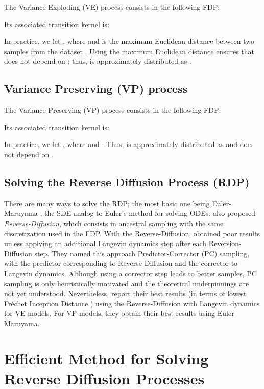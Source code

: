 \documentclass{article}
\begin{document}
The Variance Exploding (VE) process consists in the following FDP:


Its associated transition kernel is:


In practice, we let , where  and  is the maximum Euclidean distance between two samples from the dataset  \citep{song2020improved}. Using the maximum Euclidean distance ensures that  does not depend on ; thus,  is approximately distributed as .

\subsection{Variance Preserving (VP) process}

The Variance Preserving (VP) process consists in the following FDP:


Its associated transition kernel is:


In practice, we let , where  and .
Thus,  is approximately distributed as  and does not depend on .

\subsection{Solving the Reverse Diffusion Process (RDP)}

There are many ways to solve the RDP; the most basic one being Euler-Maruyama \citep{kloeden1992stochastic}, the SDE analog to Euler's method for solving ODEs.
\citet{song2020score} also proposed {\em Reverse-Diffusion}, which consists in ancestral sampling \citep{ho2020denoising} with the same discretization used in the FDP. With the Reverse-Diffusion, \citep{song2020score} obtained poor results unless applying an additional Langevin dynamics step after each Reversion-Diffusion step. They named this approach Predictor-Corrector (PC) sampling, with the predictor corresponding to Reverse-Diffusion and the corrector to Langevin dynamics. 
Although using a corrector step leads to better samples, PC sampling is only heuristically motivated and the theoretical underpinnings are not yet understood.
Nevertheless, \citep{song2020score} report their best results (in terms of lowest Fréchet Inception Distance \citep{heusel2017gans}) using the Reverse-Diffusion with Langevin dynamics for VE models. For VP models, they obtain their best results using Euler-Maruyama.


\section{Efficient Method for Solving Reverse Diffusion Processes}
\end{document}
